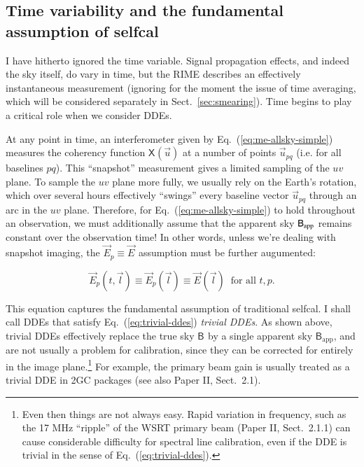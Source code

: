 \documentclass[referee]{aa}
\newcommand{\jones}[2]{\vec {#1}_{#2}}
\newcommand{\coh}[2]{\mathsf{{#1}}_{{#2}}}
\begin{document}
\subsection{Time variability and the fundamental assumption of selfcal\label{sec:timevar}}

I have hitherto ignored the time variable. Signal propagation effects, and indeed the sky itself, do vary in time, but the RIME describes an effectively instantaneous measurement (ignoring for the moment the issue of time averaging, which will be considered separately in Sect.~\ref{sec:smearing}). Time begins to play a critical role when we consider DDEs. 

At any point in time, an interferometer given by Eq.~(\ref{eq:me-allsky-simple}) measures the coherency function $\coh{X}{}(\vec u)$ at a number of points $\vec u_{pq}$ (i.e. for all baselines $pq$). This ``snapshot'' measurement gives a limited sampling of the $uv$ plane. To sample the $uv$ plane more fully, we usually rely on the Earth's rotation, which over several hours effectively ``swings'' every baseline vector $\vec u_{pq}$ through an arc in the $uv$ plane. Therefore, for Eq.~(\ref{eq:me-allsky-simple}) to hold throughout an observation, we must additionally assume that the apparent sky $\coh{B}{\rm app}$ remains constant over the observation time! In other words, unless we're dealing with snapshot imaging, the $\jones{E}{p}\equiv\jones{E}{}$ assumption must be further augumented:

\begin{equation}\label{eq:trivial-ddes}
\jones{E}{p}(t,\vec l) \equiv \jones{E}{p}(\vec l) \equiv \jones{E}{}(\vec l)\;\;\mbox{for all~} t,p. 
\end{equation}

This equation captures the fundamental assumption of traditional selfcal. I shall call DDEs that satisfy Eq.~(\ref{eq:trivial-ddes}) \emph{trivial DDEs}. As shown above, trivial DDEs effectively replace the true sky $\coh{B}{}$ by a single apparent sky $\coh{B}{\mathrm{app}}$, and are not usually a problem for calibration, since they can be corrected for entirely in the image plane.\footnote{Even then things are not always easy. Rapid variation in frequency, such as the 17 MHz ``ripple'' of the WSRT primary beam (Paper II, Sect.~2.1.1) can cause considerable difficulty for spectral line calibration, even if the DDE is trivial in the sense of Eq.~(\ref{eq:trivial-ddes}).}  For example, the primary beam gain is usually treated as a trivial DDE in 2GC packages (see also Paper II, Sect.~2.1). 
\end{document}
